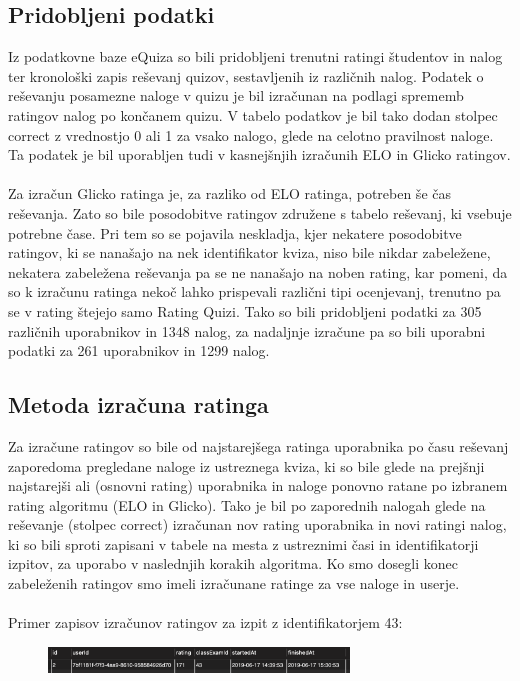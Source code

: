 \documentclass{IEEEtran}
\makeatletter
\let\old@subsection\subsection
\renewcommand{\subsection}[1]{\bigskip\old@subsection{#1}\@afterindentfalse\@afterheading}
\makeatother
\begin{document}
\subsection{Pridobljeni podatki}
Iz podatkovne baze eQuiza so bili pridobljeni trenutni ratingi študentov in nalog ter kronološki zapis reševanj quizov, sestavljenih iz različnih nalog. Podatek o reševanju posamezne naloge v quizu je bil izračunan na podlagi sprememb ratingov nalog po končanem quizu. V tabelo podatkov je bil tako dodan stolpec correct z vrednostjo 0 ali 1 za vsako nalogo, glede na celotno pravilnost naloge. Ta podatek je bil uporabljen tudi v kasnejšnjih izračunih ELO in Glicko ratingov.
\hfill
\\
\\
Za izračun Glicko ratinga je, za razliko od ELO ratinga, potreben še čas reševanja. Zato so bile posodobitve ratingov združene s tabelo reševanj, ki vsebuje potrebne čase. Pri tem so se pojavila neskladja, kjer nekatere posodobitve ratingov, ki se nanašajo na nek identifikator kviza, niso bile nikdar zabeležene, nekatera zabeležena reševanja pa se ne nanašajo na noben rating, kar pomeni, da so k izračunu ratinga nekoč lahko prispevali različni tipi ocenjevanj, trenutno pa se v rating štejejo samo Rating Quizi. Tako so bili pridobljeni podatki za 305 različnih uporabnikov in 1348 nalog, za nadaljnje izračune pa so bili uporabni podatki za 261 uporabnikov in 1299 nalog.
\\
\subsection{Metoda izračuna ratinga}

Za izračune ratingov so bile od najstarejšega ratinga uporabnika po času reševanj zaporedoma pregledane naloge iz ustreznega kviza, ki so bile glede na prejšnji najstarejši ali (osnovni rating) uporabnika in naloge ponovno ratane po izbranem rating algoritmu (ELO in Glicko). Tako je bil po zaporednih nalogah glede na reševanje (stolpec correct) izračunan nov rating uporabnika in novi ratingi nalog, ki so bili sproti zapisani v tabele na mesta z ustreznimi časi in identifikatorji izpitov, za uporabo v naslednjih korakih algoritma. Ko smo dosegli konec zabeleženih ratingov smo imeli izračunane ratinge za vse naloge in userje.
\hfill
\\
\\
Primer zapisov izračunov ratingov za izpit z identifikatorjem 43:

\lstset{basicstyle=\tiny,style=SQLstyle}
\begin{figure}[h!]
    \includegraphics[width=8cm]{PrimerTabeleUser}
    \label{fig:example}%
\end{figure}
\end{document}

